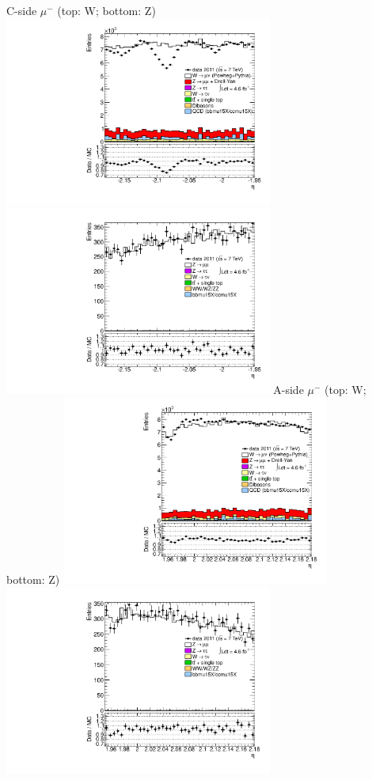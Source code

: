 {
\colb[T]
C-side $\mu^{-}$ (top: W; bottom: Z)
\centering
\includegraphics[width=0.66\textwidth]{dates/20130306/figures/etaphi/W_10_C_stack_l_eta_NEG} \\
\includegraphics[width=0.66\textwidth]{dates/20130306/figures/etaphi/ZlObarrel_10_C_stack_lN_eta_ALL.pdf}
A-side $\mu^{-}$ (top: W; bottom: Z)
\centering
\includegraphics[width=0.66\textwidth]{dates/20130306/figures/etaphi/W_10_A_stack_l_eta_NEG} \\
\includegraphics[width=0.66\textwidth]{dates/20130306/figures/etaphi/ZlObarrel_10_A_stack_lN_eta_ALL.pdf} 
\cole
}

